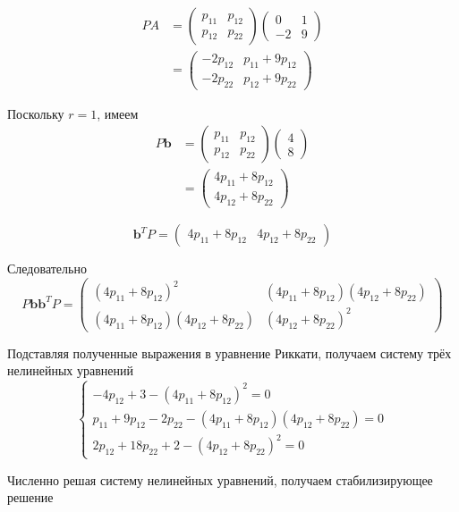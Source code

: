 \[
\begin{aligned}
PA
&=
\begin{pmatrix}p_{11}&p_{12}\\p_{12}&p_{22}\end{pmatrix}
\begin{pmatrix}0&1\\-2&9\end{pmatrix}
\\[2mm]
&=
\begin{pmatrix}
-2p_{12}&p_{11}+9p_{12}\\
-2p_{22}&p_{12}+9p_{22}
\end{pmatrix}
\end{aligned}
\]

Поскольку $r=1$, имеем
\[
\begin{aligned}
P\bm b
&=
\begin{pmatrix}p_{11}&p_{12}\\p_{12}&p_{22}\end{pmatrix}
\begin{pmatrix}4\\8\end{pmatrix}
\\[2mm]
&=
\begin{pmatrix}
4p_{11}+8p_{12}\\
4p_{12}+8p_{22}
\end{pmatrix}
\end{aligned}
\]

\[
\bm b^{T}P
=
\begin{pmatrix}
4p_{11}+8p_{12}&4p_{12}+8p_{22}
\end{pmatrix}
\]

Следовательно
\[
P\bm b\bm b^{T}P
=
\begin{pmatrix}
(4p_{11}+8p_{12})^2&
(4p_{11}+8p_{12})(4p_{12}+8p_{22})\\[2mm]
(4p_{11}+8p_{12})(4p_{12}+8p_{22})&
(4p_{12}+8p_{22})^2
\end{pmatrix}
\]

Подставляя полученные выражения в уравнение Риккати,
получаем систему трёх нелинейных уравнений
\[
\begin{cases}
-4p_{12}+3-(4p_{11}+8p_{12})^2=0\\[2mm]
p_{11}+9p_{12}-2p_{22}
-(4p_{11}+8p_{12})(4p_{12}+8p_{22})=0\\[2mm]
2p_{12}+18p_{22}+2-(4p_{12}+8p_{22})^2=0
\end{cases}
\]

Численно решая систему нелинейных уравнений, получаем стабилизирующее решение

